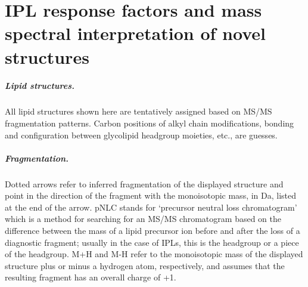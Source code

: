 \chapter{IPL response factors and mass spectral interpretation of novel structures}

\paragraph*{Lipid structures.} All lipid structures shown here are tentatively assigned based on MS/MS fragmentation patterns. Carbon positions of alkyl chain modifications, bonding and configuration between glycolipid headgroup moieties, etc., are guesses.\newline

\paragraph*{Fragmentation.} Dotted arrows refer to inferred fragmentation of the displayed structure and point in the direction of the fragment with the monoisotopic mass, in Da, listed at the end of the arrow. pNLC stands for `precursor neutral loss chromatogram' which is a method for searching for an MS/MS chromatogram based on the difference between the mass of a lipid precursor ion before and after the loss of a diagnostic fragment; usually in the case of IPLs, this is the headgroup or a piece of the headgroup. M+H and M-H refer to the monoisotopic mass of the displayed structure plus or minus a hydrogen atom, respectively, and assumes that the resulting fragment has an overall charge of +1.

\clearpage

